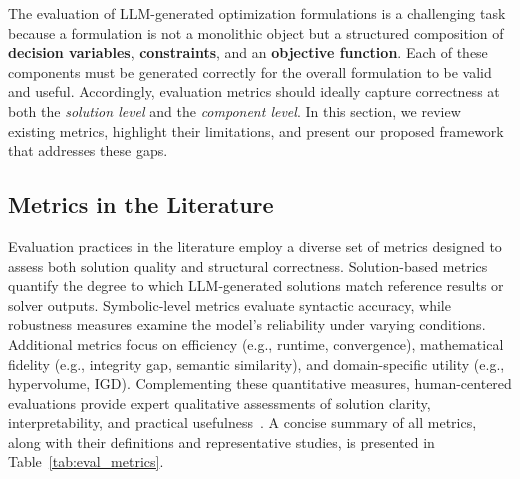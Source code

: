 \documentclass[review,12pt]{elsarticle}
\begin{document}
The evaluation of LLM-generated optimization formulations is a challenging task because a formulation is not a monolithic object but a structured composition of \textbf{decision variables}, \textbf{constraints}, and an \textbf{objective function}. Each of these components must be generated correctly for the overall formulation to be valid and useful. Accordingly, evaluation metrics should ideally capture correctness at both the \emph{solution level} and the \emph{component level}. In this section, we review existing metrics, highlight their limitations, and present our proposed framework that addresses these gaps.

\vspace{-3mm}
\subsection{Metrics in the Literature}
Evaluation practices in the literature employ a diverse set of metrics designed to assess both solution quality and structural correctness. Solution-based metrics quantify the degree to which LLM-generated solutions match reference results or solver outputs. Symbolic-level metrics evaluate syntactic accuracy, while robustness measures examine the model’s reliability under varying conditions. Additional metrics focus on efficiency (e.g., runtime, convergence), mathematical fidelity (e.g., integrity gap, semantic similarity), and domain-specific utility (e.g., hypervolume, IGD). Complementing these quantitative measures, human-centered evaluations provide expert qualitative assessments of solution clarity, interpretability, and practical usefulness~\cite{abdelrahman2025teaching}. A concise summary of all metrics, along with their definitions and representative studies, is presented in Table~\ref{tab:eval_metrics}.
\end{document}
